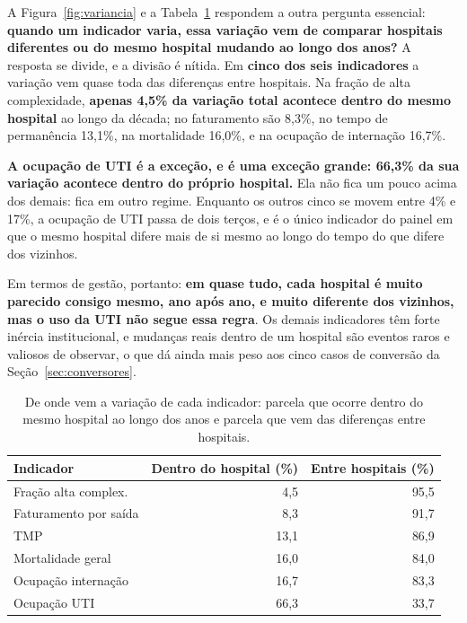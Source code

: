 \newpage
A Figura~\ref{fig:variancia} e a Tabela~\ref{tab:variancia} respondem a
outra pergunta essencial: \textbf{quando um indicador varia, essa
variação vem de comparar hospitais diferentes ou do mesmo hospital
mudando ao longo dos anos?} A resposta se divide, e a divisão é nítida.
Em \textbf{cinco dos seis indicadores} a variação vem quase toda das
diferenças entre hospitais. Na fração de alta complexidade, \textbf{apenas
4,5\% da variação total acontece dentro do mesmo hospital} ao longo da
década; no faturamento são 8,3\%, no tempo de permanência 13,1\%, na
mortalidade 16,0\%, e na ocupação de internação 16,7\%.

\textbf{A ocupação de UTI é a exceção, e é uma exceção grande: 66,3\% da
sua variação acontece dentro do próprio hospital.} Ela
não fica um pouco acima dos demais: fica em outro regime. Enquanto os
outros cinco se movem entre 4\% e 17\%, a ocupação de UTI passa de dois
terços, e é o único indicador do painel em que o mesmo hospital difere mais
de si mesmo ao longo do tempo do que difere dos vizinhos.

Em termos de gestão, portanto: \textbf{em quase tudo, cada hospital é muito
parecido consigo mesmo, ano após ano, e muito diferente dos vizinhos, mas
o uso da UTI não segue essa regra}. Os demais indicadores
têm forte inércia institucional, e mudanças reais dentro de um hospital
são eventos raros e valiosos de observar, o que dá ainda mais peso aos
cinco casos de conversão da Seção~\ref{sec:conversores}.

\begin{table}[H]
\centering
\caption{De onde vem a variação de cada indicador: parcela que ocorre
dentro do mesmo hospital ao longo dos anos e parcela que vem das
diferenças entre hospitais.}
\label{tab:variancia}
\small
\begin{tabular}{lrr}
\toprule
Indicador & Dentro do hospital (\%) & Entre hospitais (\%) \\
\midrule
Fração alta complex.   & 4,5  & 95,5 \\
Faturamento por saída        & 8,3  & 91,7 \\
TMP                    & 13,1 & 86,9 \\
Mortalidade geral      & 16,0 & 84,0 \\
Ocupação internação    & 16,7 & 83,3 \\
Ocupação UTI           & 66,3 & 33,7 \\
\bottomrule
\end{tabular}
\end{table}

